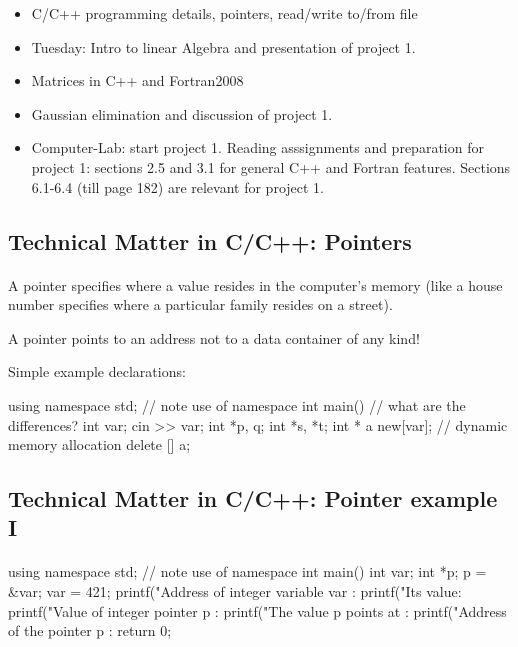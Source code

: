 \documentclass[%
oneside,                 %
final,                   %
10pt]{article}
\begin{document}
{{{{{{\begin{itemize}
  \item C/C++ programming details, pointers, read/write to/from file

  \item Tuesday: Intro to linear Algebra and presentation of project 1.

  \item Matrices in C++ and Fortran2008

  \item Gaussian elimination and discussion of project 1.

  \item Computer-Lab: start project 1. Reading asssignments and preparation for project 1: sections 2.5 and 3.1 for general C++ and Fortran features. Sections 6.1-6.4 (till page 182) are relevant for project 1.
\end{itemize}

\noindent



\subsection{Technical Matter in C/C++: Pointers}


\paragraph{}
A pointer specifies where a value resides in the computer's memory (like a house number specifies where a particular family resides on a street).

A pointer points to an address not to a data container of any kind!

Simple example declarations:

\bcppcod
  using namespace std; // note use of namespace
  int main()
 {
   // what are the differences?
   int var;
   cin >> var;
   int *p, q;
   int *s, *t;
   int * a new[var];    // dynamic memory allocation
   delete [] a;
}
\ecppcod



\subsection{Technical Matter in C/C++: Pointer example I}


\paragraph{}
\bcppcod
using namespace std; // note use of namespace
int main()
{
  int var;
  int *p;
  p = &var;
  var  = 421;
  printf("Address of integer variable var : %
  printf("Its value: %
  printf("Value of integer pointer p : %
  printf("The value p points at :  %
  printf("Address of the pointer p : %
  return 0;
}
\ecppcod



}}}}}}
\end{document}

